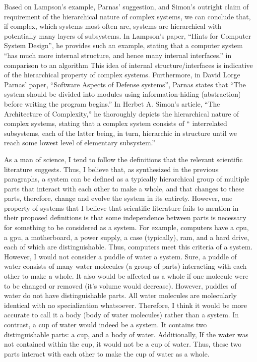 \documentclass[11pt]{article}
\begin{document}
\par Based on Lampson's example, Parnas' suggestion, and Simon's outright claim of requirement of the hierarchical nature of complex systems, we can conclude that, if complex, which systems most often are, systems are hierarchical with potentially many layers of subsystems. In Lampson's paper, ``Hints for Computer System Design'', he provides such an example, stating that a computer system ``has much more internal structure, and hence many internal interfaces.'' in comparison to an algorithm\cite{lampson:1983} This idea of internal structure/interfaces is indicative of the hierarchical property of complex systems. Furthermore, in David Lorge Parnas' paper, ``Software Aspects of Defense systems'', Parnas states that ``The system should be divided into modules using information-hiding (abstraction) before writing the program begins.''\cite{parnas:1985} In Herbet A. Simon's article, ``The Architecture of Complexity,'' he thoroughly depicts the hierarchical nature of complex systems, stating that a complex system consists of `` interrelated subsystems, each of the latter being, in turn, hierarchic in structure until we reach some lowest level of elementary subsystem.'' \cite{simon:1962}
\par As a man of science, I tend to follow the definitions that the relevant scientific literature suggests. Thus, I believe that, as synthesized in the previous paragraphs, a system can be defined as a typically hierarchical group of multiple parts that interact with each other to make a whole, and that changes to these parts, therefore, change and evolve the system in its entirety. However, one property of systems that I believe that scientific literature fails to mention in their proposed definitions is that some independence between parts is necessary for something to be considered as a system. For example, computers have a cpu, a gpu, a motherboard, a power supply, a case (typically), ram, and a hard drive, each of which are distinguishable. Thus, computers meet this criteria of a system. However, I would not consider a puddle of water a system. Sure, a puddle of water consists of many water molecules (a group of parts) interacting with each other to make a whole. It also would be affected as a whole if one molecule were to be changed or removed (it's volume would decrease). However, puddles of water do not have distinguishable parts. All water molecules are molecularly identical with no specialization whatsoever. Therefore, I think it would be more accurate to call it a body (body of water molecules) rather than a system. In contrast, a cup of water would indeed be a system. It contains two distinguishable parts: a cup, and a body of water. Additionally, If the water was not contained within the cup, it would not be a cup of water. Thus, these two parts interact with each other to make the cup of water as a whole.
\end{document}
